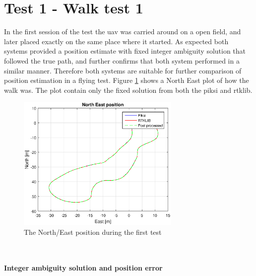 \section{Test 1 - Walk test 1}

In the first session of the test the \gls{uav} was carried around on a open field, and later placed exactly on the same place where it started. As expected both systems provided a position estimate with fixed integer ambiguity solution that followed the true path, and further confirms that both system performed in a similar manner. Therefore both systems are suitable for further comparison of position estimation in a flying test.
Figure \ref{figure:xywalk1} shows a North East plot of how the walk was. The plot contain only the fixed solution from both the piksi and rtklib. 
\begin{figure}[H]
	\centering
		\includegraphics[width=0.7\textwidth]{figs/plots/xywalk1.eps}
		\caption{The North/East position during the first test}
		\label{figure:xywalk1}
\end{figure}
~\\
\paragraph{Integer ambiguity solution and position error}~\\

